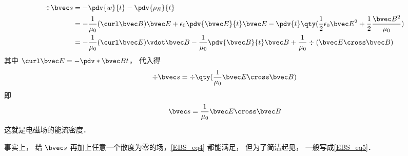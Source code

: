 \begin{equation}
\begin{aligned}
\div \bvec s &=  - \pdv{w}{t} - \pdv{\rho_E}{t}\\
&= -\frac{1}{\mu_0} (\curl \bvec B)\bvec E + \epsilon_0 \pdv{\bvec E}{t} \bvec E - \pdv{t} \qty(\frac12 \epsilon_0 \bvec E^2 + \frac12 \frac{\bvec B^2}{\mu_0})\\
&=  - \frac{1}{\mu_0} (\curl \bvec E) \vdot \bvec B - \frac{1}{\mu_0}\pdv{\bvec B}{t} \bvec B + \frac{1}{\mu_0}\div (\bvec E \cross \bvec B)
\end{aligned}
\end{equation} 
其中 $\curl \bvec E =  -\pdv*{\bvec B}{t}$， 代入得
\begin{equation}\label{EBS_eq4}
\div \bvec s = \div \qty(\frac{1}{\mu_0}\bvec E \cross \bvec B)
\end{equation} 
即
\begin{equation}\label{EBS_eq5}
\bvec s = \frac{1}{\mu_0}\bvec E \cross \bvec B
\end{equation} 
这就是电磁场的能流密度．

事实上， 给 $\bvec s$ 再加上任意一个散度为零的场，\autoref{EBS_eq4} 都能满足， 但为了简洁起见， 一般写成\autoref{EBS_eq5}． 





